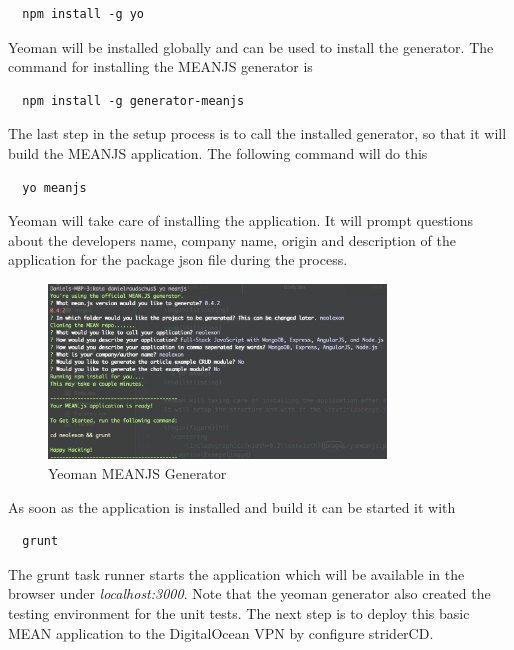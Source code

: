 \begin{lstlisting}
  npm install -g yo
\end{lstlisting}

Yeoman will be installed globally and can be used to install the generator. The command for installing the MEANJS generator is

\begin{lstlisting}
  npm install -g generator-meanjs
\end{lstlisting}

The last step in the setup process is to call the installed generator, so that it will build the MEANJS application. The following command will do this

\begin{lstlisting}
  yo meanjs
\end{lstlisting}

Yeoman will take care of installing the application. It will prompt questions about the developers name, company name, origin and description of the application
for the package json file during the process.

\begin{figure}[h!]
  \centering
  \includegraphics[width=0.8\textwidth]{images/yomean.png}
  \caption{Yeoman MEANJS Generator}
\end{figure}

As soon as the application is installed and build it can be started it with

\begin{lstlisting}
  grunt
\end{lstlisting}

The grunt task runner starts the application which will be available in the browser under \textit{localhost:3000}.
Note that the yeoman generator also created the testing environment for the unit tests. The next step is to deploy this basic MEAN application
to the DigitalOcean VPN by configure striderCD.

